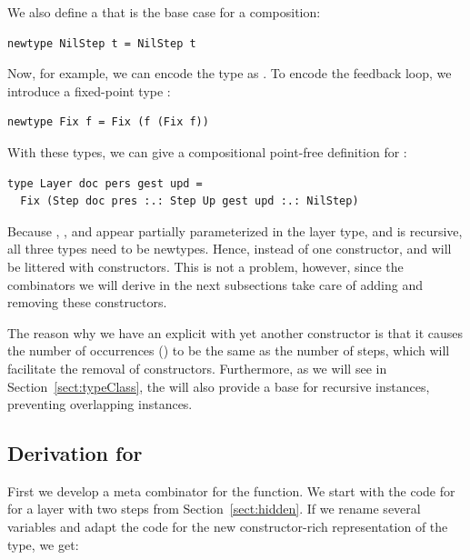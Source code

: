 \documentclass[preprint,natbib]{sigplanconf}
\begin{document}
We also define a  that is the base case for a composition:

\begin{small}
\begin{verbatim}
newtype NilStep t = NilStep t
\end{verbatim}
\end{small}

Now, for example, we can encode the type  as
. To encode the feedback loop, we introduce a fixed-point type :

\begin{small}
\begin{verbatim}
newtype Fix f = Fix (f (Fix f))
\end{verbatim}
\end{small}

With these types, we can give a compositional point-free definition for :

\begin{small}
\begin{verbatim}
type Layer doc pers gest upd = 
  Fix (Step doc pres :.: Step Up gest upd :.: NilStep)
\end{verbatim}
\end{small}

Because , , and   appear partially parameterized in the layer type, and  is recursive, all three types need to be newtypes. Hence, instead of one  constructor,  and  will be littered with constructors. This is not a problem, however, since the combinators we will derive in the next subsections take care of adding and removing these constructors.

The reason why we have an explicit  with yet another constructor is that it causes the number of occurrences () to be the same as the number of steps, which will facilitate the removal of  constructors. Furthermore, as we will see in Section~\ref{sect:typeClass}, the  will also provide a base for recursive instances, preventing overlapping instances.


%																
\subsection{Derivation for }\label{subsect:liftDerivation}

First we develop a meta combinator for the  function. We start with the code for  for a layer with two steps from Section~\ref{sect:hidden}. If we rename several variables and adapt the code for the new constructor-rich representation of the  type, we get:
\end{document}
